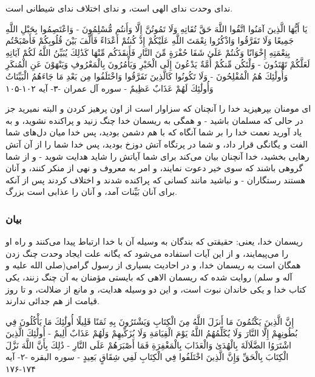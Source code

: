 ندای وحدت ندای الهی است، و ندای اختلاف ندای شیطانی است.

يَا أَيُّهَا الَّذِينَ آمَنُوا اتَّقُوا اللَّهَ حَقَّ تُقَاتِهِ وَلَا تَمُوتُنَّ إِلَّا وَأَنتُم مُّسْلِمُونَ -
وَاعْتَصِمُوا بِحَبْلِ اللَّهِ جَمِيعًا وَلَا تَفَرَّقُوا وَاذْكُرُوا نِعْمَتَ اللَّهِ عَلَيْكُمْ إِذْ كُنتُمْ
أَعْدَاءً فَأَلَّفَ بَيْنَ قُلُوبِكُمْ فَأَصْبَحْتُم بِنِعْمَتِهِ إِخْوَانًا وَكُنتُمْ عَلَىٰ شَفَا حُفْرَةٍ مِّنَ
النَّارِ فَأَنقَذَكُم مِّنْهَا كَذَٰلِكَ يُبَيِّنُ اللَّهُ لَكُمْ آيَاتِهِ لَعَلَّكُمْ تَهْتَدُونَ - وَلْتَكُن مِّنكُمْ
أُمَّةٌ يَدْعُونَ إِلَى الْخَيْرِ وَيَأْمُرُونَ بِالْمَعْرُوفِ وَيَنْهَوْنَ عَنِ الْمُنكَرِ وَأُولَٰئِكَ هُمُ
الْمُفْلِحُونَ - وَلَا تَكُونُوا كَالَّذِينَ تَفَرَّقُوا وَاخْتَلَفُوا مِن بَعْدِ مَا جَاءَهُمُ الْبَيِّنَاتُ
وَأُولَٰئِكَ لَهُمْ عَذَابٌ عَظِيمٌ - سوره آل عمران -۳- آیه ۱۰۲-۱۰۵

ای مومنان بپرهیزید خدا را آنچنان که سزاوار است از اون پرهیز کردن و
البته نمیرید جز در حالی که مسلمان باشید - و همگی به ریسمان خدا چنگ
زنید و پراکنده نشوید، و به یاد آورید نعمت خدا را بر شما آنگاه که با هم
دشمن بودید، پس خدا میان دل‌های شما الفت و یگانگی قرار داد، و شما در
پرتگاه آتش دوزخ بودید، پس خدا شما را از آن آتش رهایی بخشید، خدا آنچنان
بیان می‌کند برای شما آیاتش را شاید هدایت شوید - و از شما گروهی باشند که
سوی خیر دعوت نمایند، و امر به معروف و نهی از منکر کنند، و آنان هستند
رستگاران - و نباشید مانند کسانی که پراکنده شدند و اختلاف کردند پس از
آنکه برای آنان بَیِّنات آمد، و آنان را عذابی است بزرگ.

\subsubsection*{بیان}

ریسمان خدا، یعنی: حقیقتی که بندگان به وسیله آن با خدا ارتباط پیدا
می‌کنند و راه او را می‌پیمایند، و از این آیات استفاده می‌شود که یگانه علت
ایجاد وحدت چنگ زدن همگان است به ریسمان خدا، و در احادیث بسیاری از رسول
گرامی(صلی الله علیه و آله و سلم) روایت شده که ریسمان الاهی که بایستی
مؤمنان به آن چنگ زنند، یکی کتاب خدا و یکی خاندان نبوت است، و این دو
وسیله هدایت، و مانع از ضلالت، و تا روز قیامت از هم جدائی ندارند.


إِنَّ الَّذِينَ يَكْتُمُونَ مَا أَنزَلَ اللَّهُ مِنَ الْكِتَابِ وَيَشْتَرُونَ بِهِ ثَمَنًا قَلِيلًا أُولَٰئِكَ مَا
يَأْكُلُونَ فِي بُطُونِهِمْ إِلَّا النَّارَ وَلَا يُكَلِّمُهُمُ اللَّهُ يَوْمَ الْقِيَامَةِ وَلَا يُزَكِّيهِمْ وَلَهُمْ
عَذَابٌ أَلِيمٌ -‏ أُولَٰئِكَ الَّذِينَ اشْتَرَوُا الضَّلَالَةَ بِالْهُدَىٰ وَالْعَذَابَ بِالْمَغْفِرَةِ فَمَا
أَصْبَرَهُمْ عَلَى النَّارِ -‏ ذَٰلِكَ بِأَنَّ اللَّهَ نَزَّلَ الْكِتَابَ بِالْحَقِّ وَإِنَّ الَّذِينَ اخْتَلَفُوا فِي
الْكِتَابِ لَفِي شِقَاقٍ بَعِيدٍ - سوره البقره -۲- آیه ۱۷۴-۱۷۶

